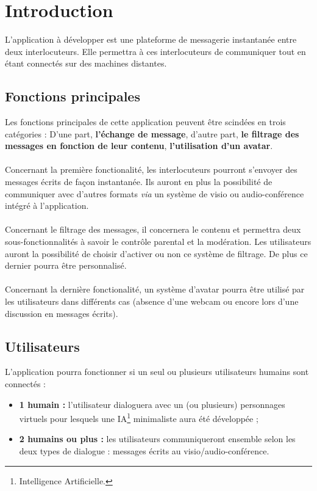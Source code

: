 \documentclass[11pt,dvipsnames,svgnames]{report}
\begin{document}
\newpage
\tableofcontents

\newpage


\chapter{Introduction}

L'application à développer est une plateforme de messagerie instantanée entre deux interlocuteurs. Elle permettra à ces interlocuteurs de communiquer tout en étant connectés sur des machines distantes. 

\section{Fonctions principales}
Les fonctions principales de cette application peuvent être scindées en trois catégories : 
D'une part, \textbf{l'échange de message}, d'autre part, \textbf{ le filtrage des messages en fonction de leur contenu}, \textbf{l'utilisation d'un avatar}.\\ \\

Concernant la première fonctionalité, 
les interlocuteurs pourront s'envoyer des messages écrits de façon instantanée. Ils auront en plus la possibilité de communiquer avec d'autres formats \emph{via} un système de visio ou audio-conférence intégré à l'application. \\ \\

Concernant le filtrage des messages,
il concernera le contenu et permettra deux sous-fonctionnalités à savoir le contrôle parental et la modération. Les utilisateurs auront la possibilité de choisir d'activer ou non ce système de filtrage. De plus ce dernier pourra être personnalisé.\\ \\

Concernant la dernière fonctionalité, 
un système d'avatar pourra être utilisé par les utilisateurs dans différents cas (absence d'une webcam ou encore lors d'une discussion en messages écrits).

\section{Utilisateurs}
L'application pourra fonctionner si un seul ou plusieurs utilisateurs humains sont connectés :
\begin{itemize}
\item \textbf{1 humain : } l'utilisateur dialoguera avec un (ou plusieurs) personnages virtuels pour lesquels une IA\footnote{Intelligence Artificielle.} minimaliste aura été développée ;
\item \textbf{2 humains ou plus : } les utilisateurs communiqueront ensemble selon les deux types de dialogue : messages écrits au visio/audio-conférence.

\end{itemize}
\end{document}
